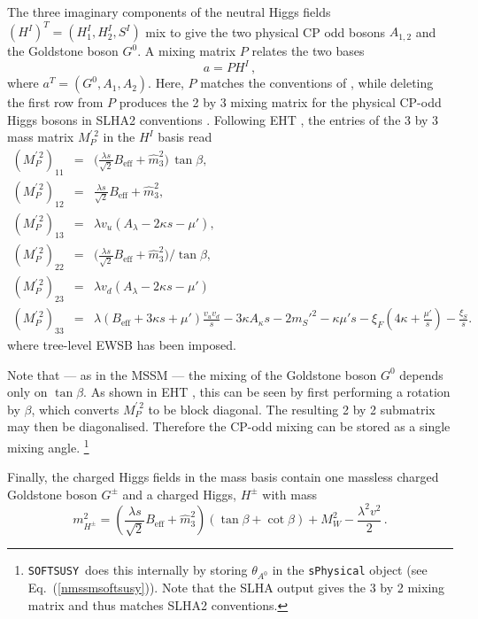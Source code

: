 \documentclass[final,3p,times,pdflatex]{elsarticle}
\def\SOFTSUSY{{\tt SOFTSUSY}}
\newcommand{\be}{\begin{equation}}
\newcommand{\ee}{\end{equation}}
\newcommand{\ba}{\begin{eqnarray}}
\newcommand{\ea}{\end{eqnarray}}
\newcommand{\ds}{\displaystyle}
\begin{document}
The three imaginary components of the neutral Higgs fields 
$(H^I)^T = (H^I_1, H_2^I, S^I)$ mix to give the two physical CP odd bosons 
$A_{1,2}$ and the Goldstone boson $G^0$.  A mixing matrix $P$ relates the two 
bases
%
\be 
a = P H^I\,, 
\ee
%
where $a^T = (G^0,A_1,A_2)$.  Here, $P$ matches the conventions of 
\cite{Degrassi:2009yq}, while deleting the first row from $P$ produces the 2 by
 3 mixing matrix for the physical CP-odd Higgs bosons in SLHA2 conventions \cite{Allanach:2008qq}. Following EHT \cite{Ellwanger:2009dp}, the entries of the 
3 by 3 mass matrix $ M^{\prime \, 2}_{P}$ in the $H^I$ basis read
%
\ba
( M^{\prime \, 2}_{P})_{11} & = & \Bigg(\ds\frac{\lambda s}{\sqrt{2}} B_\textrm{eff} +
\widehat{m}_3^2\Bigg)\,\tan\beta , \\
( M^{\prime \, 2}_{P})_{12} & = & \ds\frac{\lambda s}{\sqrt{2}} B_\textrm{eff} +
\widehat{m}_3^2, \\
( M^{\prime \, 2}_{P})_{13} & = & \lambda v_u (A_\lambda - 2\kappa s - \mu'), \\
( M^{\prime \, 2}_{P})_{22} & = & \Bigg(\ds\frac{\lambda s}{\sqrt{2}} B_\textrm{eff} +
\widehat{m}_3^2\Bigg)/\tan\beta ,  \\
( M^{\prime \, 2}_{P})_{23} & = & \lambda v_d (A_\lambda - 2\kappa s - \mu')\\
( M^{\prime \, 2}_{P})_{33} & = & \lambda (B_\textrm{eff}+3\kappa s +\mu')\ds\frac{v_u
v_d}{s} -3\kappa A_\kappa s  -2 m_{S}'^2 -\kappa \mu' s 
-\xi_F\left(4\kappa + \frac{\mu'}{s}\right) -\ds\frac{\xi_S}{s}.
\label{eq:MA0}
\ea
%
where tree-level EWSB has been imposed.

Note that --- as in the MSSM --- the mixing of the Goldstone boson $G^0$ depends
 only on $\tan\beta$. As shown in EHT \cite{Ellwanger:2009dp}, this can be seen 
by first performing a rotation by $\beta$, which converts $M^{\prime\, 2}_P$ to be 
block diagonal.  The resulting 2 by 2 submatrix may then be diagonalised. 
Therefore the CP-odd mixing can be stored as a single mixing angle.%
  \footnote{\SOFTSUSY~does this internally by storing $\theta_{A^0}$ in the 
    {\tt sPhysical} object (see Eq.~(\ref{nmssmsoftsusy})).  Note that the
    SLHA output 
    gives the 3 by 2 mixing matrix and thus matches SLHA2 conventions.}

Finally, the charged Higgs fields in the mass basis contain one massless 
charged Goldstone boson $G^{\pm}$ and a charged Higgs, $H^\pm$ with mass
%
\be 
m_{H^\pm}^2 = \left(\ds\frac{\lambda s}{\sqrt{2}} B_\textrm{eff} +
\widehat{m}_3^2\right)(\tan \beta + \cot \beta) + M_W^2 - \ds\frac{\lambda^2 v^2}{2}\,. 
%
\ee
  
\end{document}
